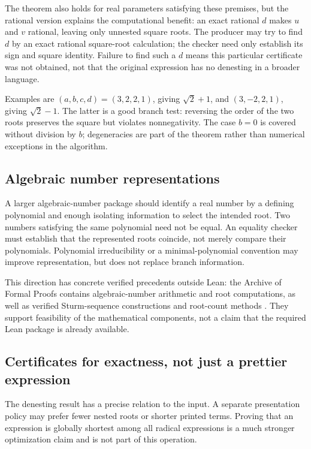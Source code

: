 \documentclass[11pt,a4paper]{article}
\theoremstyle{definition}
\begin{document}
The theorem also holds for real parameters satisfying these premises, but the
rational version explains the computational benefit: an exact rational $d$
makes $u$ and $v$ rational, leaving only unnested square roots. The producer may
try to find $d$ by an exact rational square-root calculation; the checker need
only establish its sign and square identity. Failure to find such a $d$ means
this particular certificate was not obtained, not that the original expression
has no denesting in a broader language.

Examples are $(a,b,c,d)=(3,2,2,1)$, giving $\sqrt2+1$, and
$(3,-2,2,1)$, giving $\sqrt2-1$. The latter is a good branch test: reversing the
order of the two roots preserves the square but violates nonnegativity.
The case $b=0$ is covered without division by $b$; degeneracies are part of the
theorem rather than numerical exceptions in the algorithm.

\subsection{Algebraic number representations}
A larger algebraic-number package should identify a real number by a defining
polynomial and enough isolating information to select the intended root. Two
numbers satisfying the same polynomial need not be equal. An equality checker
must establish that the represented roots coincide, not merely compare their
polynomials. Polynomial irreducibility or a minimal-polynomial convention may
improve representation, but does not replace branch information.

This direction has concrete verified precedents outside Lean: the Archive of
Formal Proofs contains algebraic-number arithmetic and root computations, as
well as verified Sturm-sequence constructions and root-count methods
\cite{afp-algebraic,afp-sturm}. They support feasibility of the mathematical
components, not a claim that the required Lean package is already available.

\subsection{Certificates for exactness, not just a prettier expression}
The denesting result has a precise relation to the input. A separate presentation
policy may prefer fewer nested roots or shorter printed terms. Proving that an
expression is globally shortest among all radical expressions is a much stronger
optimization claim and is not part of this operation.
\end{document}
